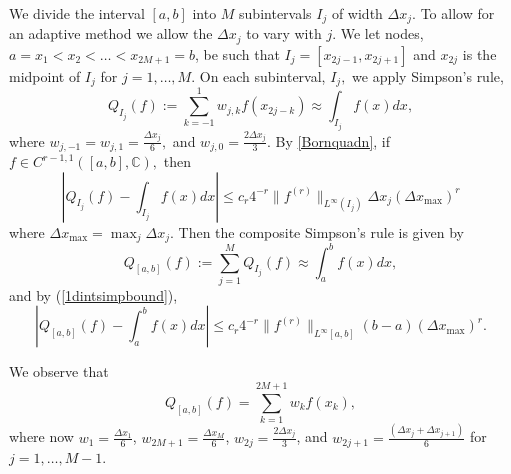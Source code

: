 \documentclass{birkjour}
\theoremstyle{definition}
\theoremstyle{remark}
\numberwithin{equation}{section}
\begin{document}
We divide the interval $[a,b]$ into $M$ 
subintervals $I_j$ of width  $\Delta x_j$. 
To allow for an adaptive method we allow the $\Delta x_j$ to vary with $j$.
We let  nodes, $a = x_1 < x_2 < \dots < x_{2M+1} = b$, be such that
 $I_j = [x_{2j-1}, x_{2j+1}]$ and $x_{2j}$ is the midpoint of $I_j$ for $j=1,\dots, M$.
On each subinterval, $I_j,$ we apply  Simpson's rule, 
\begin{equation}
    Q_{I_j}(f) := \sum_{k=-1}^1 w_{j,k} f(x_{2j-k}) \approx \int_{I_j} f(x) dx,
\end{equation}
where $w_{j,-1} = w_{j,1} = \frac{\Delta x_j}{6},$ and $w_{j,0} = \frac{2 \Delta x_j}{3}.$
By \eqref{Bornquadn}, if $f \in C^{r-1,1}([a,b], \mathbb{C}),$ then 
\begin{equation}\label{1dintsimpbound}
    \left| Q_{I_j}(f) - \int_{I_j} f(x) dx \right| \leq c_r 4^{-r} \|f^{(r)}\|_{L^{\infty}(I_j)}\Delta x_j (\Delta x_{\operatorname{max}})^{r} 
\end{equation}
where
$\Delta x_{\operatorname{max}}= \operatorname{max}_j  \Delta x_j$.
Then the composite Simpson's rule is given by 
\begin{equation}\label{qdoublestar}
    Q_{[a,b]}(f) := \sum_{j=1}^M Q_{I_j}(f) \approx \int_a^b f(x) dx,
\end{equation}  and by (\ref{1dintsimpbound}), 
\begin{equation}
\left| Q_{[a,b]}(f) - \int_{a}^b f(x) dx \right| \leq c_r  4^{-r} \|f^{(r)}\|_{L^{\infty}[a,b]}
 (b-a)(\Delta x_{\operatorname{max}})^r.
\end{equation}



We observe that
\begin{equation}\label{Qab}
    Q_{[a,b]}(f) = \sum_{k=1}^{2M+1} w_k f(x_k),
\end{equation}
where now
$w_1 = \frac{\Delta x_1}{6}$,  $w_{2M+1} = \frac{\Delta x_M}{6}$, 
$w_{2j} = \frac{2 \Delta x_j}{3}$, and $w_{2j+1} = \frac{(\Delta x_j + \Delta x_{j+1})}{6}$ for $j=1, \dots, M-1.$
\end{document}
